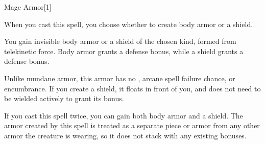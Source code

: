 
\begin{spellsection}{Mage Armor}[1]
    \begin{spellheader}
    \end{spellheader}
    \begin{spellcontent}
        \begin{spelltargetinginfo}
            \spellspecial When you cast this spell, you choose whether to create body armor or a shield.
        \end{spelltargetinginfo}
        \begin{spelleffects}
            \spelleffect You gain invisible body armor or a shield of the chosen kind, formed from telekinetic force. Body armor grants a  defense bonus, while a shield grants a  defense bonus.
            \par Unlike mundane armor, this armor has no , arcane spell failure chance, or encumbrance. If you create a shield, it floats in front of you, and does not need to be wielded actively to grant its bonus.
            \spelldur \durlong
        \end{spelleffects}
    \end{spellcontent}
    \begin{spellfooter}
        \spellnotes If you cast this spell twice, you can gain both body armor and a shield. The armor created by this spell is treated as a separate piece or armor from any other armor the creature is wearing, so it does not stack with any existing bonuses.
        \miscastexplode
    \end{spellfooter}
    \begin{spellaugments}
    \end{spellaugments}
\end{spellsection}

